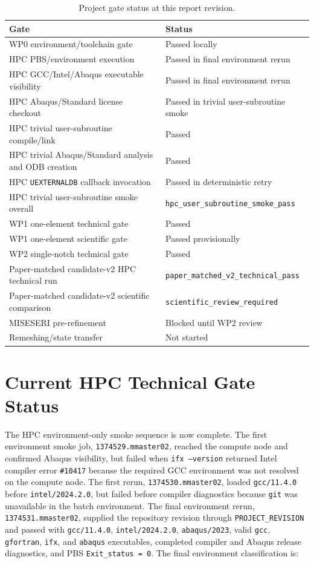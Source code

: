 \documentclass[11pt,a4paper]{article}
\begin{document}
\begin{table}[H]
\centering
\caption{Project gate status at this report revision.}
\begin{tabular}{@{}ll@{}}
\toprule
Gate & Status \\
\midrule
WP0 environment/toolchain gate & Passed locally \\
HPC PBS/environment execution & Passed in final environment rerun \\
HPC GCC/Intel/Abaqus executable visibility & Passed in final environment rerun \\
HPC Abaqus/Standard license checkout & Passed in trivial user-subroutine smoke \\
HPC trivial user-subroutine compile/link & Passed \\
HPC trivial Abaqus/Standard analysis and ODB creation & Passed \\
HPC \texttt{UEXTERNALDB} callback invocation & Passed in deterministic retry \\
HPC trivial user-subroutine smoke overall & \texttt{hpc\_user\_subroutine\_smoke\_pass} \\
WP1 one-element technical gate & Passed \\
WP1 one-element scientific gate & Passed provisionally \\
WP2 single-notch technical gate & Passed \\
Paper-matched candidate-v2 HPC technical run & \texttt{paper\_matched\_v2\_technical\_pass} \\
Paper-matched candidate-v2 scientific comparison & \texttt{scientific\_review\_required} \\
MISESERI pre-refinement & Blocked until WP2 review \\
Remeshing/state transfer & Not started \\
\bottomrule
\end{tabular}
\end{table}

\section{Current HPC Technical Gate Status}

The HPC environment-only smoke sequence is now complete. The first environment smoke job, \texttt{1374529.mmaster02}, reached the compute node and confirmed Abaqus visibility, but failed when \texttt{ifx --version} returned Intel compiler error \texttt{\#10417} because the required GCC environment was not resolved on the compute node. The first rerun, \texttt{1374530.mmaster02}, loaded \texttt{gcc/11.4.0} before \texttt{intel/2024.2.0}, but failed before compiler diagnostics because \texttt{git} was unavailable in the batch environment. The final environment rerun, \texttt{1374531.mmaster02}, supplied the repository revision through \texttt{PROJECT\_REVISION} and passed with \texttt{gcc/11.4.0}, \texttt{intel/2024.2.0}, \texttt{abaqus/2023}, valid \texttt{gcc}, \texttt{gfortran}, \texttt{ifx}, and \texttt{abaqus} executables, completed compiler and Abaqus release diagnostics, and PBS \texttt{Exit\_status = 0}. The final environment classification is:
\end{document}
